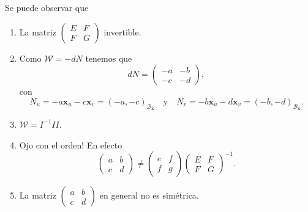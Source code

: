 \begin{observation} Se puede observar que
\begin{enumerate}
	\item La matriz $\displaystyle \begin{pmatrix} E & F \\ F & G \end{pmatrix} $ invertible.
	\item Como $\displaystyle \mathcal{W}= - dN $ tenemos que 
		\[dN = \begin{pmatrix} -a & - b \\ - c & - d \end{pmatrix} ,\]
		con 
		\[N_{u}=-a \textbf{x} _{u}-c \textbf{x} _{v} = \left(-a,-c\right)_{ \mathcal{B}_{ \textbf{x} }} \quad \text{y} \quad N_{v}=-b \textbf{x} _{u}-d \textbf{x} _{v}= \left(- b, - d\right)_{\mathcal{B}_{ \textbf{x} }}.\]
	\item $\displaystyle \mathcal{W}=I^{-1}II $.
	\item Ojo con el orden! En efecto
		\[\begin{pmatrix} a & b \\ c & d \end{pmatrix}\neq \begin{pmatrix} e & f \\ f& g \end{pmatrix}\begin{pmatrix} E & F\\ F & G \end{pmatrix}^{-1} .\]
	\item La matriz $\displaystyle \begin{pmatrix} a & b \\ c & d \end{pmatrix} $ en general no es simétrica.
\end{enumerate}
\end{observation}

